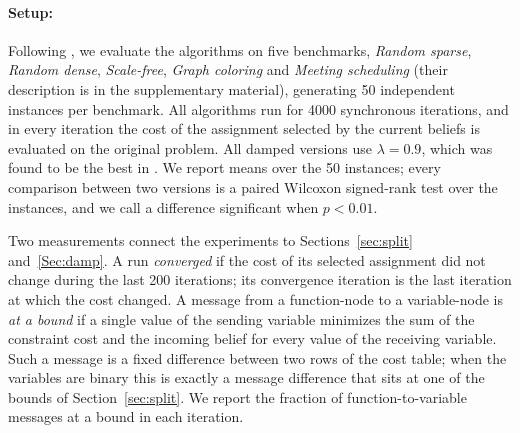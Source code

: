 \paragraph{Setup:}
Following \citet{CohenGZ20}, we evaluate the algorithms on five benchmarks, \emph{Random sparse}, \emph{Random dense}, \emph{Scale-free}, \emph{Graph coloring} and \emph{Meeting scheduling} (their description is in the supplementary material), generating 50 independent instances per benchmark. All algorithms run for 4000 synchronous iterations, and in every iteration the cost of the assignment selected by the current beliefs is evaluated on the original problem. All damped versions use $\lambda = 0.9$, which was found to be the best in \citet{CohenGZ20}. We report means over the 50 instances; every comparison between two versions is a paired Wilcoxon signed-rank test over the instances, and we call a difference significant when $p < 0.01$.

Two measurements connect the experiments to Sections~\ref{sec:split} and~\ref{Sec:damp}. A run \emph{converged} if the cost of its selected assignment did not change during the last 200 iterations; its convergence iteration is the last iteration at which the cost changed. A message from a function-node to a variable-node is \emph{at a bound} if a single value of the sending variable minimizes the sum of the constraint cost and the incoming belief for every value of the receiving variable. Such a message is a fixed difference between two rows of the cost table; when the variables are binary this is exactly a message difference that sits at one of the bounds of Section~\ref{sec:split}. We report the fraction of function-to-variable messages at a bound in each iteration.

